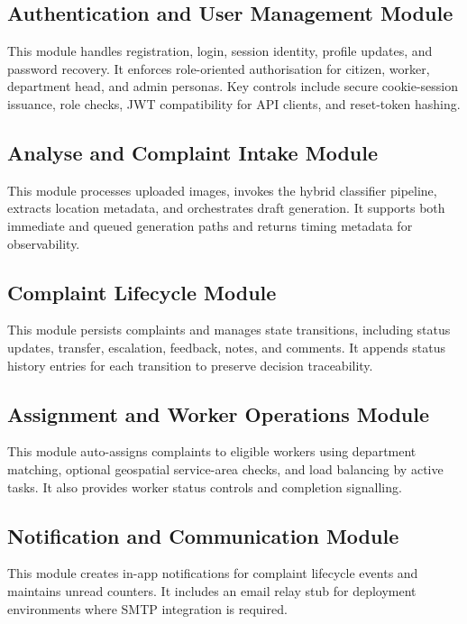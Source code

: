 \subsection{Authentication and User Management Module}

This module handles registration, login, session identity, profile updates, and password recovery. It enforces role-oriented authorisation for citizen, worker, department head, and admin personas. Key controls include secure cookie-session issuance, role checks, JWT compatibility for API clients, and reset-token hashing.

\subsection{Analyse and Complaint Intake Module}

This module processes uploaded images, invokes the hybrid classifier pipeline, extracts location metadata, and orchestrates draft generation. It supports both immediate and queued generation paths and returns timing metadata for observability.

\subsection{Complaint Lifecycle Module}

This module persists complaints and manages state transitions, including status updates, transfer, escalation, feedback, notes, and comments. It appends status history entries for each transition to preserve decision traceability.

\subsection{Assignment and Worker Operations Module}

This module auto-assigns complaints to eligible workers using department matching, optional geospatial service-area checks, and load balancing by active tasks. It also provides worker status controls and completion signalling.

\subsection{Notification and Communication Module}

This module creates in-app notifications for complaint lifecycle events and maintains unread counters. It includes an email relay stub for deployment environments where SMTP integration is required.

